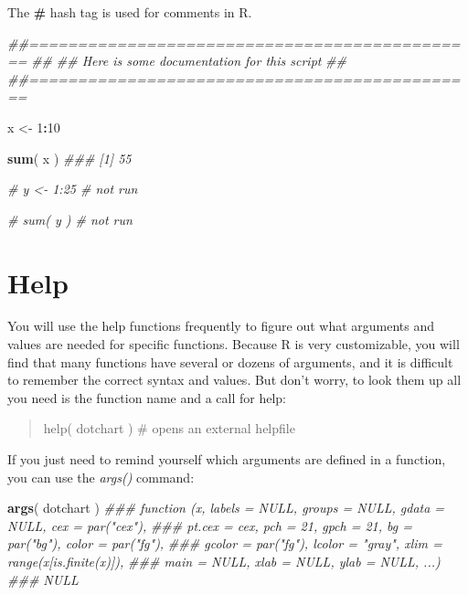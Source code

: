 \documentclass[]{book}
\newenvironment{Shaded}{\begin{snugshade}}{\end{snugshade}}
\newcommand{\CommentTok}[1]{\textcolor[rgb]{0.56,0.35,0.01}{\textit{#1}}}
\newcommand{\DecValTok}[1]{\textcolor[rgb]{0.00,0.00,0.81}{#1}}
\newcommand{\KeywordTok}[1]{\textcolor[rgb]{0.13,0.29,0.53}{\textbf{#1}}}
\newcommand{\NormalTok}[1]{#1}
\newcommand{\OperatorTok}[1]{\textcolor[rgb]{0.81,0.36,0.00}{\textbf{#1}}}
\newcommand{\StringTok}[1]{\textcolor[rgb]{0.31,0.60,0.02}{#1}}
\theoremstyle{definition}
\theoremstyle{definition}
\theoremstyle{definition}
\theoremstyle{remark}
\begin{document}
The \textbf{\#} hash tag is used for comments in R.

\begin{Shaded}
\begin{Highlighting}[]

\CommentTok{##==============================================}
\CommentTok{##}
\CommentTok{##  Here is some documentation for this script}
\CommentTok{##}
\CommentTok{##==============================================}

\NormalTok{x <-}\StringTok{ }\DecValTok{1}\OperatorTok{:}\DecValTok{10}

\KeywordTok{sum}\NormalTok{( x )}
\CommentTok{### [1] 55}

\CommentTok{# y <- 1:25     # not run}

\CommentTok{# sum( y )      # not run}
\end{Highlighting}
\end{Shaded}

\hypertarget{help}{%
\section{Help}\label{help}}

You will use the help functions frequently to figure out what arguments
and values are needed for specific functions. Because R is very
customizable, you will find that many functions have several or dozens
of arguments, and it is difficult to remember the correct syntax and
values. But don't worry, to look them up all you need is the function
name and a call for help:

\begin{quote}
help( dotchart ) \# opens an external helpfile
\end{quote}

If you just need to remind yourself which arguments are defined in a
function, you can use the \emph{args()} command:

\begin{Shaded}
\begin{Highlighting}[]
\KeywordTok{args}\NormalTok{( dotchart )}
\CommentTok{### function (x, labels = NULL, groups = NULL, gdata = NULL, cex = par("cex"), }
\CommentTok{###     pt.cex = cex, pch = 21, gpch = 21, bg = par("bg"), color = par("fg"), }
\CommentTok{###     gcolor = par("fg"), lcolor = "gray", xlim = range(x[is.finite(x)]), }
\CommentTok{###     main = NULL, xlab = NULL, ylab = NULL, ...) }
\CommentTok{### NULL}
\end{Highlighting}
\end{Shaded}
\end{document}
